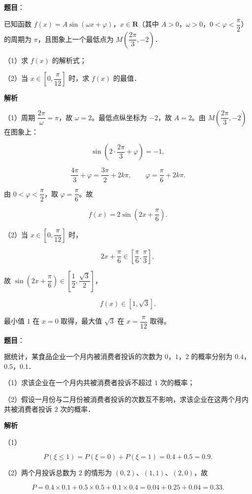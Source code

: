 \begin{answer}

\textbf{题目}：

已知函数 $f(x)=A\sin(\omega x+\varphi)$，$x\in\mathbf R$（其中 $A>0$，$\omega>0$，$0<\varphi<\dfrac\pi2$）的周期为 $\pi$，且图象上一个最低点为 $M\left(\dfrac{2\pi}3,-2\right)$．

（1）求 $f(x)$ 的解析式；

（2）当 $x\in\left[0,\dfrac\pi{12}\right]$ 时，求 $f(x)$ 的最值．

\textbf{解析}

（1）周期 $\dfrac{2\pi}\omega=\pi$，故 $\omega=2$。最低点纵坐标为 $-2$，故 $A=2$。由 $M\left(\dfrac{2\pi}3,-2\right)$ 在图象上：

\nopagebreak[4]
\[\sin\left(2\cdot\frac{2\pi}3+\varphi\right)=-1,\]

\nopagebreak[4]
\[\frac{4\pi}3+\varphi=\frac{3\pi}2+2k\pi,\qquad \varphi=\frac\pi6+2k\pi.\]

由 $0<\varphi<\dfrac\pi2$，取 $\varphi=\dfrac\pi6$。故

\nopagebreak[4]
\[f(x)=2\sin\left(2x+\frac\pi6\right).\]

（2）当 $x\in\left[0,\dfrac\pi{12}\right]$ 时，

\nopagebreak[4]
\[2x+\frac\pi6\in\left[\frac\pi6,\frac\pi3\right],\]

故 $\sin\left(2x+\dfrac\pi6\right)\in\left[\dfrac12,\dfrac{\sqrt3}2\right]$，

\nopagebreak[4]
\[f(x)\in[1,\sqrt3].\]

最小值 $1$ 在 $x=0$ 取得，最大值 $\sqrt3$ 在 $x=\dfrac\pi{12}$ 取得。


\end{answer}
\begin{answer}

\textbf{题目}：

据统计，某食品企业一个月内被消费者投诉的次数为 $0$，$1$，$2$ 的概率分别为 $0.4$，$0.5$，$0.1$．

（1）求该企业在一个月内共被消费者投诉不超过 $1$ 次的概率；

（2）假设一月份与二月份被消费者投诉的次数互不影响，求该企业在这两个月内共被消费者投诉 $2$ 次的概率．

\textbf{解析}

（1）

\nopagebreak[4]
\[P(\xi\leqslant1)=P(\xi=0)+P(\xi=1)=0.4+0.5=0.9.\]

（2）两个月投诉总数为 $2$ 的情形为 $(0,2)$、$(1,1)$、$(2,0)$，故

\nopagebreak[4]
\[P=0.4\times0.1+0.5\times0.5+0.1\times0.4
=0.04+0.25+0.04=0.33.\]


\end{answer}
